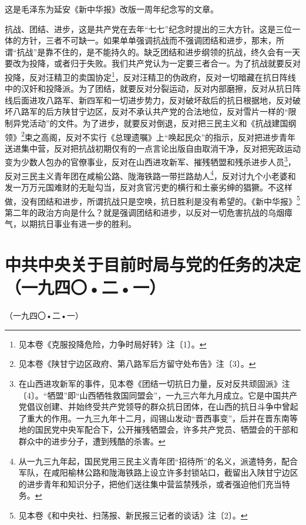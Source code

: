 \documentclass[cn,11pt,chinese]{elegantbook}
\def\myformat#1{\hfil\hfil #1}
\begin{document}
\begin{introduction}\item  这是毛泽东为延安《新中华报》改版一周年纪念写的文章。\end{introduction}
抗战、团结、进步，这是共产党在去年“七七”纪念时提出的三大方针。这是三位一体的方针，三者不可缺一。如果单单强调抗战而不强调团结和进步，那末，所谓“抗战”是靠不住的，是不能持久的。缺乏团结和进步纲领的抗战，终久会有一天要改为投降，或者归于失败。我们共产党认为一定要三者合一。为了抗战就要反对投降，反对汪精卫的卖国协定\footnote[1]{见本卷《克服投降危险，力争时局好转》注〔1〕。}，反对汪精卫的伪政府，反对一切暗藏在抗日阵线中的汉奸和投降派。为了团结，就要反对分裂运动，反对内部磨擦，反对从抗日阵线后面进攻八路军、新四军和一切进步势力，反对破坏敌后的抗日根据地，反对破坏八路军的后方陕甘宁边区，反对不承认共产党的合法地位，反对雪片一样的“限制异党活动”的文件。为了进步，就要反对倒退，反对把三民主义和《抗战建国纲领》\footnote[2]{见本卷《陕甘宁边区政府、第八路军后方留守处布告》注〔3〕。}束之高阁，反对不实行《总理遗嘱》上“唤起民众”的指示，反对把进步青年送进集中营，反对把抗战初期仅有的一点言论出版自由取消干净，反对把宪政运动变为少数人包办的官僚事业，反对在山西进攻新军、摧残牺盟和残杀进步人员\footnote[3]{在山西进攻新军的事件，见本卷《团结一切抗日力量，反对反共顽固派》注〔4〕。“牺盟”即“山西牺牲救国同盟会”，一九三六年九月成立。它是中国共产党倡议创建、并始终受共产党领导的群众抗日团体，在山西的抗日斗争中曾起了重大的作用。一九三九年十二月，阎锡山发动“晋西事变”，后并在晋东南等地的国民党中央军配合下，公开摧残牺盟会，许多共产党员、牺盟会的干部和群众中的进步分子，遭到残酷的杀害。}，反对三民主义青年团在咸榆公路、陇海铁路一带拦路劫人\footnote[4]{从一九三九年起，国民党用三民主义青年团“招待所”的名义，派遣特务，配合军队，在咸阳榆林公路和陇海铁路上设立许多封锁站口，截留出入陕甘宁边区的进步青年和知识分子，把他们送往集中营监禁残杀，或者强迫他们充当特务。}，反对讨九个小老婆和发一万万元国难财的无耻勾当，反对贪官污吏的横行和土豪劣绅的猖獗。不这样做，没有团结和进步，所谓抗战只是空唤，抗日胜利是没有希望的。《新中华报》\footnote[5]{见本卷《和中央社、扫荡报、新民报三记者的谈话》注〔2〕。}第二年的政治方向是什么？就是强调团结和进步，以反对一切危害抗战的乌烟瘴气，以期抗日事业有进一步的胜利。\\
\newpage\section*{\myformat{中共中央关于目前时局与党的任务的决定}\\\myformat{（一九四〇•二•一）}}
\begin{introduction}\item （一九四〇•二•一）\end{introduction}
\end{document}
